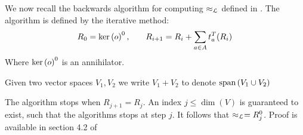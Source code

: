 We now recall the backwards algorithm for computing $\approx_{\mathcal{L}}$ defined in \cite{BONCHI201277}.
The algorithm is defined by the iterative method:
\begin{eqnarray}
  R_0 = \text{ker}\left(o\right)^0, & \quad & R_{i+1} = R_i + \sum_{a \in A} t_a^T(R_i) \label{back} 
\end{eqnarray}
Where $\text{ker}\left(o\right)^0$ is an annihilator.

\begin{note}
  Given two vector spaces $V_1, V_2$ we write $V_1 + V_2$ to 
  denote $\text{span}\left(V_1 \cup V_2\right)$
\end{note}


The algorithm stops when $R_{j+1} = R_j$. An index $j \leq \dim(V)$ is 
guaranteed to exist, such that the algorithms stops at step $j$.
It follows that $\approx_{\mathcal{L}} = R_j^0$.
Proof is available in section 4.2 of \cite{BONCHI201277}
